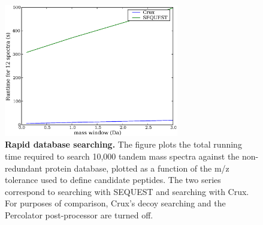 \documentclass{bioinfo}
\begin{document}
\begin{figure}
  \centering
  \includegraphics[width=3in]{./Images/indexing.eps}
  \caption{{\bf Rapid database searching.}  The figure plots the total
  running time required to search 10,000 tandem mass spectra against
  the non-redundant protein database, plotted as a function of the m/z
  tolerance used to define candidate peptides.  The two series
  correspond to searching with SEQUEST and searching with Crux.  For
  purposes of comparison, Crux's decoy searching and the Percolator
  post-processor are turned off.
  \label{figure:indexing}}
\end{figure}
\end{document}
